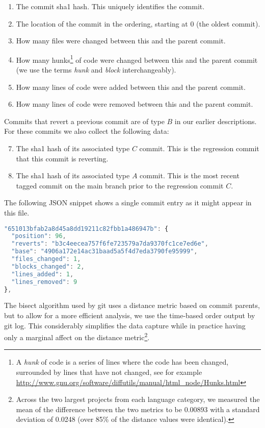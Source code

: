\documentclass[10pt,journal,compsoc]{IEEEtran}
\begin{document}
\begin{enumerate}
\item The commit sha1 hash. This uniquely identifies the commit.
\item The location of the commit in the ordering, starting at 0 (the oldest commit).
\item How many files were changed between this and the parent commit.
\item How many hunks\footnote{A {\it hunk\/} of code is a series of lines where the code has been changed, surrounded by lines that have not changed, see for example \url{http://www.gnu.org/software/diffutils/manual/html_node/Hunks.html}} of code were changed between this and the parent commit (we use the terms {\it hunk\/} and {\it block\/} interchangeably).
\item How many lines of code were added between this and the parent commit.
\item How many lines of code were removed between this and the parent commit.
\end{enumerate}

Commits that revert a previous commit are of type $B$ in our earlier descriptions. For these commits we also collect the following data:

\begin{enumerate}
\setcounter{enumi}{6}
\item The sha1 hash of its associated type $C$ commit. This is the regression commit that this commit is reverting.
\item The sha1 hash of its associated type $A$ commit. This is the most recent tagged commit on the main branch prior to the regression commit $C$. 
\end{enumerate}

The following JSON snippet shows a single commit entry as it might appear in this file.

\begin{lstlisting}[language=JavaScript]
"651013bfab2a8d45a8dd19211c82fbb1a486947b": {
  "position": 96,
  "reverts": "b3c4eecea757f6fe723579a7da9370fc1ce7ed6e",
  "base": "4906a172e14ac31baad5a5f4d7eda3790fe95999",
  "files_changed": 1,
  "blocks_changed": 2,
  "lines_added": 1,
  "lines_removed": 9
},
\end{lstlisting}

The bisect algorithm used by {\code git} uses a distance metric based on commit parents, but to allow for a more efficient analysis, we use the time-based order output by {\code git log}. This considerably simplifies the data capture while in practice having only a marginal affect on the distance metric\footnote{Across the two largest projects from each language category, we measured the mean of the difference between the two metrics to be 0.00893 with a standard deviation of 0.0248 (over 85\% of the distance values were identical).}.
\end{document}
